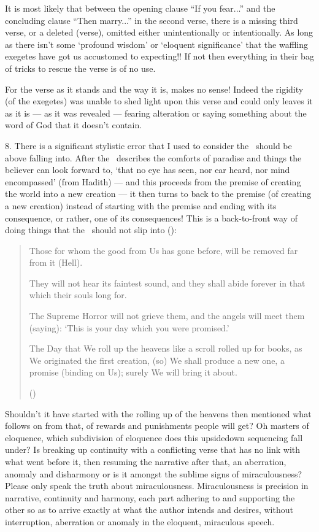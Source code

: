 \documentclass[12pt]{memoir}
\begin{document}
It is most likely that between the opening clause “If you fear...”
and the concluding clause “Then marry...” in the second verse,
there is a missing third verse, or a deleted (verse),
omitted either unintentionally or intentionally.
As long as there isn’t some ‘profound wisdom’ or ‘eloquent significance’
that the waffling exegetes have got us accustomed to expecting!!
If not then everything in their bag of tricks
to rescue the verse is of no use.

For the verse as it stands and the way it is, makes no sense!
Indeed the rigidity (of the exegetes) was unable to shed light
upon this verse and could only leaves it as it is — as it was revealed —
fearing alteration or saying something about the word of God
that it doesn’t contain.

8. There is a significant stylistic error
that I used to consider the \Quran\ should be above falling into.
After the \Quran\ describes the comforts of paradise
and things the believer can look forward to,
‘that no eye has seen, nor ear heard, nor mind encompassed’ (from Hadith) —
and this proceeds from the premise of creating the world into a new creation —
it then turns to back to the premise (of creating a new creation)
instead of starting with the premise and ending with its consequence,
or rather, one of its consequences!
This is a back-to-front way of doing things
that the \Quran\ should not slip into ():

\begin{quote}
Those for whom the good from Us has gone before,
will be removed far from it (Hell).

They will not hear its faintest sound,
and they shall abide forever in that which their souls long for.

The Supreme Horror will not grieve them,
and the angels will meet them (saying):
‘This is your day which you were promised.’

The Day that We roll up the heavens like a scroll rolled up for books,
as We originated the first creation, (so) We shall produce a new one,
a promise (binding on Us); surely We will bring it about.

()
\end{quote}

Shouldn’t it have started with the rolling up of the heavens
then mentioned what follows on from that,
of rewards and punishments people will get?
Oh masters of eloquence, which sub\–division of eloquence
does this upside\–down sequencing fall under?
Is breaking up continuity with a conflicting verse
that has no link with what went before it,
then resuming the narrative after that, an aberration,
anomaly and disharmony or is it amongst the sublime signs of miraculousness?
Please only speak the truth about miraculousness.
Miraculousness is precision in narrative, continuity and harmony,
each part adhering to and supporting the other so as to arrive exactly
at what the author intends and desires, without interruption,
aberration or anomaly in the eloquent, miraculous speech.
\end{document}

